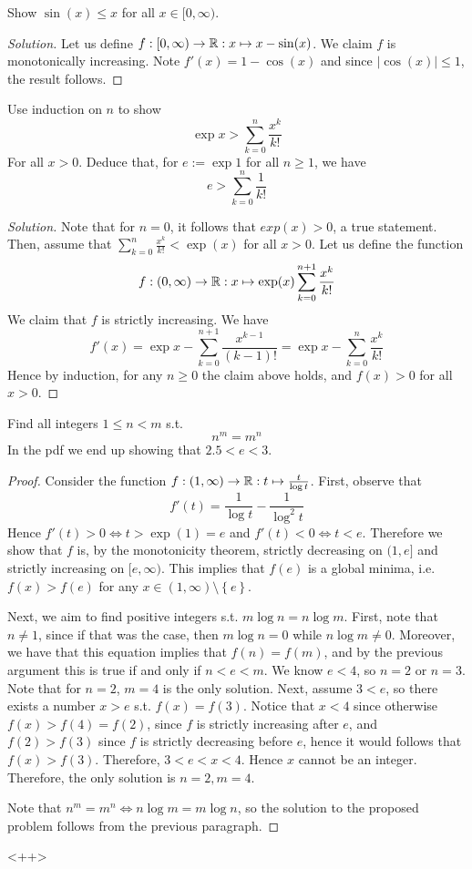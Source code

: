 \begin{exercise}
  Show $\sin(x)\leq x$ for all $x\in [0,\infty)$.
\end{exercise}
\begin{proof}[Solution]
  Let us define $f:[0,\infty)\to\mathbb R:x\mapsto x-\sin(x)$. We claim $f$ is monotonically
  increasing. Note $f'(x)=1-\cos(x)$ and since $|\cos(x)|\leq 1$, the result follows. 
\end{proof}

\begin{exercise}
  Use induction on $n$ to show 
  \[\exp x > \sum_{k=0}^{n}\frac{x^k}{k!}\]
  For all $x>0$. Deduce that, for $e:=\exp 1$ for all $n\geq 1$, we have
  \[e>\sum_{k=0}^n \frac{1}{k!} \]
\end{exercise}
\begin{proof}[Solution]
  Note that for $n=0$, it follows that $exp(x)>0$, a true statement. Then, assume that
  $\sum_{k=0}^n \frac{x^k}{k!}<\exp(x)$ for all $x>0$. Let us define the function
  \[f:(0,\infty)\to\mathbb R:x\mapsto \exp(x) \sum_{k=0}^{n+1} \frac{x^k}{k!}\]
  We claim that $f$ is strictly increasing. We have 
  \[f'(x)= \exp x - \sum_{k=0}^{n+1}\frac{x^{k-1}}{(k-1)!} = \exp x -
  \sum_{k=0}^n\frac{x^k}{k!}\]
  Hence by induction, for any $n\geq 0$ the claim above holds, and $f(x)>0$ for all $x>0$.
\end{proof}


\begin{exercise}
  Find all integers $1\leq n < m$ s.t. 
  \[n^m= m^n\]
  In the pdf we end up showing that $2.5<e<3$.
\end{exercise}
\begin{proof}
  Consider the function $f:(1,\infty)\to\mathbb R: t\mapsto \frac{t}{\log t}$. First, observe
  that 
  \[f'(t)=\frac{1}{\log t}-\frac{1}{\log^2 t}\]
  Hence $f'(t)>0 \iff t>\exp(1)=e$ and $f'(t)<0 \iff t<e$. Therefore we show that $f$ is,
  by the monotonicity theorem, strictly decreasing on $(1,e]$ and strictly increasing on
  $[e,\infty)$. This implies that $f(e)$ is a global minima, i.e. $f(x)>f(e)$ for any
  $x\in (1,\infty)\setminus \left\{ e \right\}$.  

  Next, we aim to find positive integers s.t. $m\log n = n\log m$. First, note that $n\neq
  1$, since if that was the case, then $m\log n=0$ while $n\log m\neq 0$. Moreover, we
  have that this equation implies that $f(n)=f(m)$, and by the previous argument this is
  true if and only if $n<e<m$. We know $e<4$, so $n=2$ or $n=3$. Note that for $n=2$,
  $m=4$ is the only solution. Next, assume $3<e$, so there exists a number $x>e$ s.t.
  $f(x)=f(3)$. Notice that $x<4$ since otherwise $f(x)>f(4)=f(2)$, since $f$ is strictly
  increasing after $e$, and $f(2)>f(3)$ since $f$ is strictly decreasing before $e$, hence
  it would follows that $f(x)>f(3)$. Therefore, $3<e<x<4$. Hence $x$ cannot be an integer.
  Therefore, the only solution is $n=2,m=4$.

  Note that $n^m=m^n \iff n\log m = m\log n$, so the solution to the proposed problem
  follows from the previous paragraph. 

\end{proof}<++>
